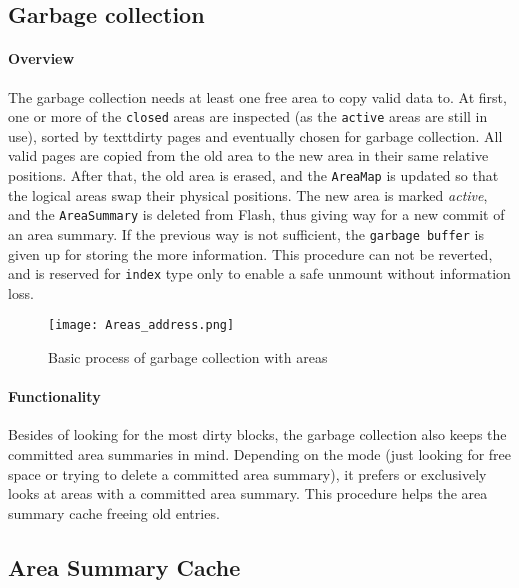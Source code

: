 \subsection{Garbage collection}
\paragraph{Overview}
The garbage collection needs at least one free area to copy valid data to. At first, one or more of the \texttt{closed} areas are inspected (as the \texttt{active} areas are still in use), sorted by textt{dirty} pages and eventually chosen for garbage collection. All valid pages are copied from the old area to the new area in their same relative positions. After that, the old area is erased, and the \texttt{AreaMap} is updated so that the logical areas swap their physical positions. The new area is marked \textit{active}, and the \texttt{AreaSummary} is deleted from Flash, thus giving way for a new commit of an area summary. If the previous way is not sufficient, the \texttt{garbage buffer} is given up for storing the more information. This procedure can not be reverted, and is reserved for \texttt{index} type only to enable a safe unmount without information loss.
\begin{figure}[ht]
  \centering\texttt{[image: Areas\_address.png]}
  \caption{Basic process of garbage collection with areas}
  \label{fig:area_address}
\end{figure}

\paragraph{Functionality}
Besides of looking for the most dirty blocks, the garbage collection also keeps the committed area summaries in mind. Depending on the mode (just looking for free space or trying to delete a committed area summary), it prefers or exclusively looks at areas with a committed area summary. This procedure helps the area summary cache freeing old entries.

\subsection{Area Summary Cache}
\label{ascache}
